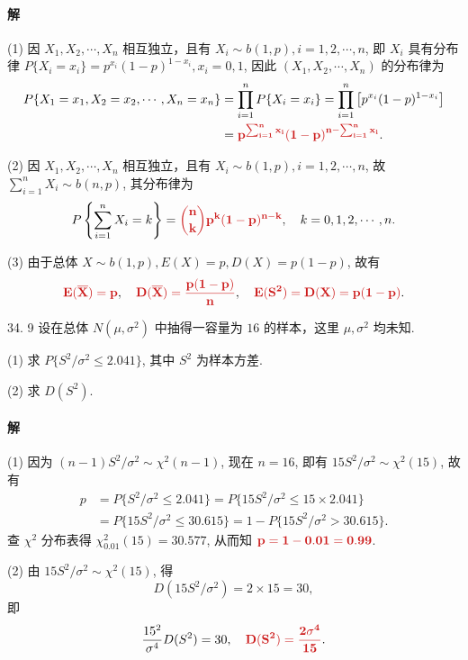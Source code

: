 \documentclass[11pt, UTF8]{ctexart}
\newcommand{\ans}[1]{\mathbf{\color{fred}#1}}
\begin{document}
\paragraph{\color{fblue}解}
(1) 因 $X_1, X_2, \cdots, X_n$ 相互独立，且有 $X_i \sim b(1,p), i=1,2,\cdots,n$, 即 $X_i$ 具有分布律 $P\{X_i=x_i\} = p^{x_i}(1-p)^{1-x_i}, x_i=0,1$, 因此 $(X_1, X_2, \cdots, X_n)$ 的分布律为
\begin{align*}
P\{X_1=x_1, X_2=x_2, \cdots, X_n=x_n\} &= \prod_{i=1}^n P\{X_i=x_i\} = \prod_{i=1}^n \left[p^{x_i}(1-p)^{1-x_i}\right] \\
&= \ans{p^{\sum_{i=1}^n x_i} (1-p)^{n-\sum_{i=1}^n x_i}}.
\end{align*}

(2) 因 $X_1, X_2, \cdots, X_n$ 相互独立，且有 $X_i \sim b(1,p), i=1,2,\cdots,n$, 故 $\sum\limits_{i=1}^n X_i \sim b(n,p)$, 其分布律为
\[ P\left\{\sum_{i=1}^n X_i = k\right\} = \ans{\binom{n}{k} p^k (1-p)^{n-k}}, \quad k=0,1,2,\cdots,n. \]

(3) 由于总体 $X \sim b(1,p), E(X)=p, D(X)=p(1-p)$, 故有
\[ \ans{E(\overline{X}) = p}, \quad \ans{D(\overline{X}) = \frac{p(1-p)}{n}}, \quad \ans{E(S^2) = D(X) = p(1-p)}. \]

\vspace{1.5em}

\begin{problem}{3}{4. 9}
设在总体 $N(\mu,\sigma^2)$ 中抽得一容量为 $16$ 的样本，这里 $\mu,\sigma^2$ 均未知.

(1) 求 $P\{S^2/\sigma^2 \leqslant 2.041\}$, 其中 $S^2$ 为样本方差.

(2) 求 $D(S^2)$.
\end{problem}

\paragraph{\color{fblue}解}
(1) 因为 $(n-1)S^2 / \sigma^2 \sim \chi^2(n-1)$, 现在 $n=16$, 即有 $15S^2/\sigma^2 \sim \chi^2(15)$, 故有
\begin{align*}
p &= P\{S^2/\sigma^2 \leqslant 2.041\} = P\{15S^2/\sigma^2 \leqslant 15 \times 2.041\} \\
  &= P\{15S^2/\sigma^2 \leqslant 30.615\} = 1 - P\{15S^2/\sigma^2 > 30.615\}.
\end{align*}
查 $\chi^2$ 分布表得 $\chi_{0.01}^2(15) = 30.577$, 从而知 $\ans{p = 1 - 0.01 = 0.99}$.

(2) 由 $15S^2/\sigma^2 \sim \chi^2(15)$, 得
\[ D(15S^2/\sigma^2) = 2 \times 15 = 30, \]
即
\[ \frac{15^2}{\sigma^4}D(S^2) = 30, \quad \ans{D(S^2) = \frac{2\sigma^4}{15}}. \]
\end{document}
